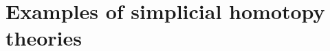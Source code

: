 \documentclass[../main]{subfiles}
\begin{document}
\chapter{Examples of simplicial homotopy theories}\label{ch:2}
\setcounter{section}{-1}











\end{document}
